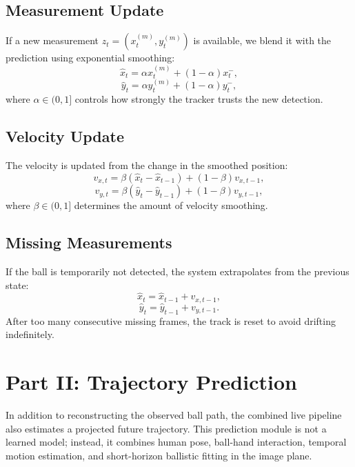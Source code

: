 \documentclass[11pt]{article}
\begin{document}
\subsection{Measurement Update}
If a new measurement $z_t = (x_t^{(m)}, y_t^{(m)})$ is available, we blend it with the prediction using exponential smoothing:
\begin{equation}
    \hat{x}_t = \alpha x_t^{(m)} + (1-\alpha)x_t^-,
\end{equation}
\begin{equation}
    \hat{y}_t = \alpha y_t^{(m)} + (1-\alpha)y_t^-,
\end{equation}
where $\alpha \in (0,1]$ controls how strongly the tracker trusts the new detection.

\subsection{Velocity Update}
The velocity is updated from the change in the smoothed position:
\begin{equation}
    v_{x,t} = \beta(\hat{x}_t - \hat{x}_{t-1}) + (1-\beta)v_{x,t-1},
\end{equation}
\begin{equation}
    v_{y,t} = \beta(\hat{y}_t - \hat{y}_{t-1}) + (1-\beta)v_{y,t-1},
\end{equation}
where $\beta \in (0,1]$ determines the amount of velocity smoothing.

\subsection{Missing Measurements}
If the ball is temporarily not detected, the system extrapolates from the previous state:
\begin{equation}
    \hat{x}_t = \hat{x}_{t-1} + v_{x,t-1},
\end{equation}
\begin{equation}
    \hat{y}_t = \hat{y}_{t-1} + v_{y,t-1}.
\end{equation}
After too many consecutive missing frames, the track is reset to avoid drifting indefinitely.

\section{Part II: Trajectory Prediction}
In addition to reconstructing the observed ball path, the combined live pipeline also estimates a projected future trajectory. This prediction module is not a learned model; instead, it combines human pose, ball-hand interaction, temporal motion estimation, and short-horizon ballistic fitting in the image plane.
\end{document}
